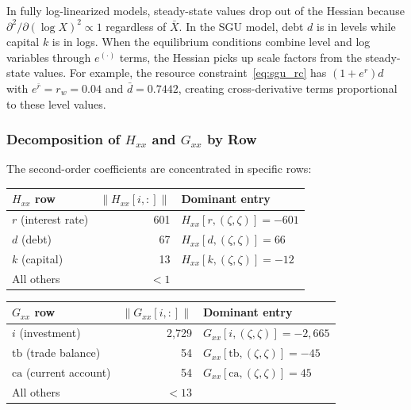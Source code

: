 \documentclass[11pt,a4paper]{article}
\theoremstyle{definition}
\begin{document}
	In fully log-linearized models, steady-state values drop out of the Hessian because $\partial^2 / \partial (\log X)^2 \propto 1$ regardless of $\bar{X}$.
	In the SGU model, debt $d$ is in levels while capital $k$ is in logs.
	When the equilibrium conditions combine level and log variables through $e^{(\cdot)}$ terms, the Hessian picks up scale factors from the steady-state values.
	For example, the resource constraint~\eqref{eq:sgu_rc} has $(1 + e^r) d$ with $e^{\bar{r}} = r_w = 0.04$ and $\bar{d} = 0.7442$, creating cross-derivative terms proportional to these level values.

	\subsubsection{Decomposition of $H_{xx}$ and $G_{xx}$ by Row}

	The second-order coefficients are concentrated in specific rows:

	\begin{center}
	\begin{tabular}{lrl}
		\toprule
		\textbf{$H_{xx}$ row} & $\|H_{xx}[i,:]\|$ & \textbf{Dominant entry} \\
		\midrule
		$r$ (interest rate) & 601 & $H_{xx}[r, (\zeta, \zeta)] = -601$ \\
		$d$ (debt) & 67 & $H_{xx}[d, (\zeta, \zeta)] = 66$ \\
		$k$ (capital) & 13 & $H_{xx}[k, (\zeta, \zeta)] = -12$ \\
		All others & $< 1$ & \\
		\bottomrule
	\end{tabular}
	\end{center}

	\begin{center}
	\begin{tabular}{lrl}
		\toprule
		\textbf{$G_{xx}$ row} & $\|G_{xx}[i,:]\|$ & \textbf{Dominant entry} \\
		\midrule
		$i$ (investment) & 2,729 & $G_{xx}[i, (\zeta, \zeta)] = -2{,}665$ \\
		$\text{tb}$ (trade balance) & 54 & $G_{xx}[\text{tb}, (\zeta, \zeta)] = -45$ \\
		$\text{ca}$ (current account) & 54 & $G_{xx}[\text{ca}, (\zeta, \zeta)] = 45$ \\
		All others & $< 13$ & \\
		\bottomrule
	\end{tabular}
	\end{center}
\end{document}
